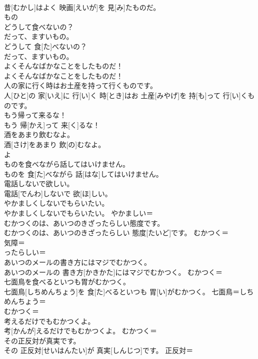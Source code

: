 \documentclass[8pt]{extreport}
\begin{document}
\begin{CJK}{UTF8}{min}
\\	昔[むかし]はよく 映画[えいが]を 見[み]たものだ。	
\\	もの 
\\	どうして食べないの？ 
\\	だって、ますいもの。	
\\	どうして 食[た]べないの？ 
\\	だって、ますいもの。	
\\	よくそんなばかなことをしたものだ！	
\\	よくそんなばかなことをしたものだ！	
\\	人の家に行く時はお土産を持って行くものです。	
\\	人[ひと]の 家[いえ]に 行[い]く 時[とき]はお 土産[みやげ]を 持[も]って 行[い]くものです。	
\\	もう帰って来るな！	
\\	もう 帰[かえ]って 来[く]るな！	
\\	酒をあまり飲むなよ。	
\\	酒[さけ]をあまり 飲[の]むなよ。	
\\	よ 
\\	ものを食べながら話してはいけません。	
\\	ものを 食[た]べながら 話[はな]してはいけません。	
\\	電話しないで欲しい。	
\\	電話[でんわ]しないで 欲[ほ]しい。	
\\	やかましくしないでもらいたい。	
\\	やかましくしないでもらいたい。	やかましい＝ 
\\	むかつくのは、あいつのきざったらしい態度です。	
\\	むかつくのは、あいつのきざったらしい 態度[たいど]です。	むかつく＝ 
\\	気障＝ 
\\	ったらしい＝ 
\\	あいつのメールの書き方にはマジでむかつく。	
\\	あいつのメールの 書き方[かきかた]にはマジでむかつく。	むかつく＝ 
\\	七面鳥を食べるといつも胃がむかつく。	
\\	七面鳥[しちめんちょう]を 食[た]べるといつも 胃[い]がむかつく。	七面鳥＝しちめんちょう＝ 
\\	むかつく＝ 
\\	考えるだけでもむかつくよ。	
\\	考[かんが]えるだけでもむかつくよ。	むかつく＝ 
\\	その正反対が真実です。	
\\	その 正反対[せいはんたい]が 真実[しんじつ]です。	正反対＝ 

\end{CJK}
\end{document}
